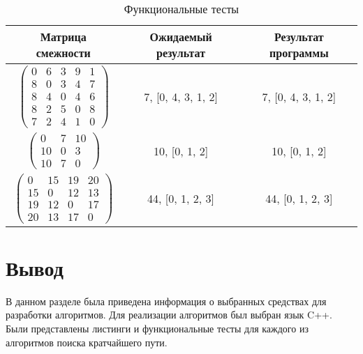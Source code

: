 \begin{table}[h!]
	\begin{center}
		\begin{threeparttable}
			\captionsetup{justification=raggedright,singlelinecheck=off}
			\caption{Функциональные тесты}
			\label{tests}
			\begin{tabular}{|c|c|c|}
				\hline
				Матрица смежности & Ожидаемый результат & Результат программы \\
				\hline
				$ \begin{pmatrix}
					0 &  6 &  3 &  9 & 1 \\
					8 &  0 &  3 &  4 & 7 \\
					8&  4 &  0 & 4 & 6 \\
					8 & 2 & 5 &  0 & 8\\
					7 &  2 &  4 &  1 & 0
				\end{pmatrix}$ &
				7, [0, 4, 3, 1, 2] &
				7, [0, 4, 3, 1, 2] \\
				\hline			
				$ \begin{pmatrix}
					0 & 7 & 10 \\
					10 & 0 & 3 \\
					10 & 7 & 0	
				\end{pmatrix}$ &
				10, [0, 1, 2] &
				10, [0, 1, 2] \\
				\hline			
				$ \begin{pmatrix}
					0 & 15 & 19 & 20 \\
					15 &  0 & 12 & 13 \\
					19 & 12 &  0 & 17 \\
					20 & 13 & 17 &  0
				\end{pmatrix}$ &
				44, [0, 1, 2, 3] &
				44, [0, 1, 2, 3] \\
				\hline
			\end{tabular}
		\end{threeparttable}	
	\end{center}
\end{table}

\section*{Вывод}
В данном разделе была приведена информация о выбранных средствах для разработки алгоритмов. 
Для реализации алгоритмов был выбран язык C++.
Были представлены листинги и функциональные тесты для каждого из алгоритмов поиска кратчайшего пути.